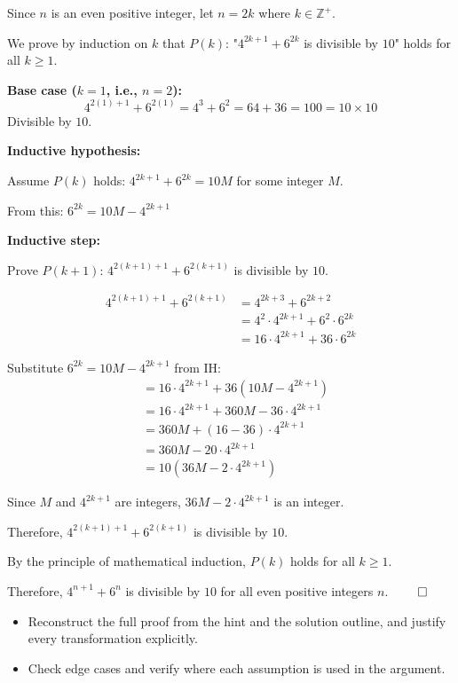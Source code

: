 \begin{solution}
Since $n$ is an even positive integer, let $n = 2k$ where $k \in \mathbb{Z}^+$.

We prove by induction on $k$ that $P(k)$: "$4^{2k+1} + 6^{2k}$ is divisible by $10$" holds for all $k \geq 1$.

\vspace{0.3cm}

\textbf{Base case ($k=1$, i.e., $n=2$):}
\[
4^{2(1)+1} + 6^{2(1)} = 4^3 + 6^2 = 64 + 36 = 100 = 10 \times 10
\]
Divisible by $10$. \checkmark

\vspace{0.3cm}

\textbf{Inductive hypothesis:}

Assume $P(k)$ holds: $4^{2k+1} + 6^{2k} = 10M$ for some integer $M$.

From this: $6^{2k} = 10M - 4^{2k+1}$

\vspace{0.3cm}

\textbf{Inductive step:}

Prove $P(k+1)$: $4^{2(k+1)+1} + 6^{2(k+1)}$ is divisible by $10$.

\begin{align*}
4^{2(k+1)+1} + 6^{2(k+1)} &= 4^{2k+3} + 6^{2k+2} \\
&= 4^2 \cdot 4^{2k+1} + 6^2 \cdot 6^{2k} \\
&= 16 \cdot 4^{2k+1} + 36 \cdot 6^{2k}
\end{align*}

Substitute $6^{2k} = 10M - 4^{2k+1}$ from IH:
\begin{align*}
&= 16 \cdot 4^{2k+1} + 36(10M - 4^{2k+1}) \\
&= 16 \cdot 4^{2k+1} + 360M - 36 \cdot 4^{2k+1} \\
&= 360M + (16 - 36) \cdot 4^{2k+1} \\
&= 360M - 20 \cdot 4^{2k+1} \\
&= 10(36M - 2 \cdot 4^{2k+1})
\end{align*}

Since $M$ and $4^{2k+1}$ are integers, $36M - 2 \cdot 4^{2k+1}$ is an integer.

Therefore, $4^{2(k+1)+1} + 6^{2(k+1)}$ is divisible by $10$. \checkmark

\vspace{0.3cm}

By the principle of mathematical induction, $P(k)$ holds for all $k \geq 1$.

Therefore, $4^{n+1} + 6^n$ is divisible by $10$ for all even positive integers $n$. $\qed$
\end{solution}

\begin{takeaways}
\begin{itemize}[leftmargin=*]
\item Reconstruct the full proof from the hint and the solution outline, and justify every transformation explicitly.
\item Check edge cases and verify where each assumption is used in the argument.
\end{itemize}
\end{takeaways}
